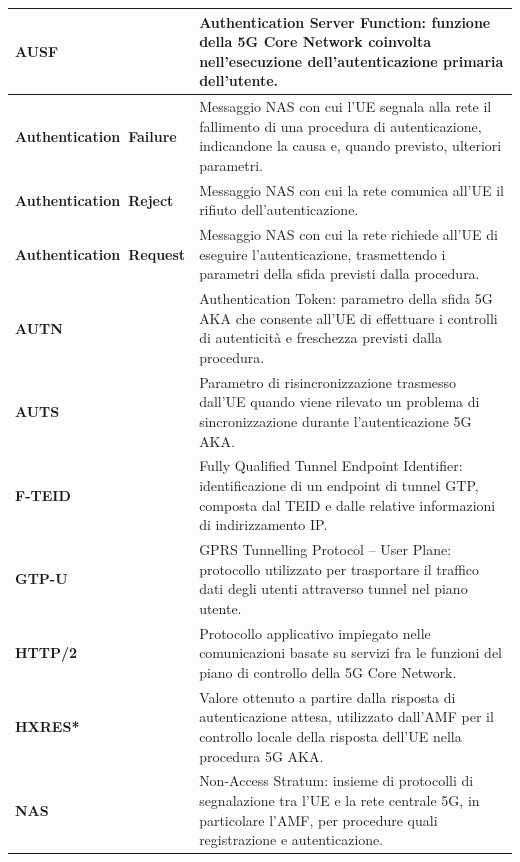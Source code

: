 \begin{longtable}{|>{\raggedright\arraybackslash}p{}|>{\raggedright\arraybackslash}p{}|}
\mbox{\textbf{AUSF}} & Authentication Server Function: funzione della 5G Core Network coinvolta nell'esecuzione dell'autenticazione primaria dell'utente. \\
\hline

\mbox{\textbf{Authentication Failure}} & Messaggio NAS con cui l'UE segnala alla rete il fallimento di una procedura di autenticazione, indicandone la causa e, quando previsto, ulteriori parametri. \\
\hline

\mbox{\textbf{Authentication Reject}} & Messaggio NAS con cui la rete comunica all'UE il rifiuto dell'autenticazione. \\
\hline

\mbox{\textbf{Authentication Request}} & Messaggio NAS con cui la rete richiede all'UE di eseguire l'autenticazione, trasmettendo i parametri della sfida previsti dalla procedura. \\
\hline

\mbox{\textbf{AUTN}} & Authentication Token: parametro della sfida 5G AKA che consente all'UE di effettuare i controlli di autenticità e freschezza previsti dalla procedura. \\
\hline

\mbox{\textbf{AUTS}} & Parametro di risincronizzazione trasmesso dall'UE quando viene rilevato un problema di sincronizzazione durante l'autenticazione 5G AKA. \\
\hline

\mbox{\textbf{F-TEID}} & Fully Qualified Tunnel Endpoint Identifier: identificazione di un endpoint di tunnel GTP, composta dal TEID e dalle relative informazioni di indirizzamento IP. \\
\hline

\mbox{\textbf{GTP-U}} & GPRS Tunnelling Protocol -- User Plane: protocollo utilizzato per trasportare il traffico dati degli utenti attraverso tunnel nel piano utente. \\
\hline

\mbox{\textbf{HTTP/2}} & Protocollo applicativo impiegato nelle comunicazioni basate su servizi fra le funzioni del piano di controllo della 5G Core Network. \\
\hline

\mbox{\textbf{HXRES*}} & Valore ottenuto a partire dalla risposta di autenticazione attesa, utilizzato dall'AMF per il controllo locale della risposta dell'UE nella procedura 5G AKA. \\
\hline

\mbox{\textbf{NAS}} & Non-Access Stratum: insieme di protocolli di segnalazione tra l'UE e la rete centrale 5G, in particolare l'AMF, per procedure quali registrazione e autenticazione. \\
\hline


\end{longtable}

